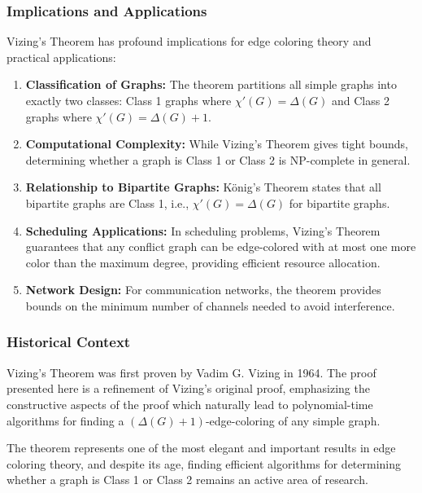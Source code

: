 \documentclass{article}
\theoremstyle{definition}
\begin{document}
\subsubsection{Implications and Applications}

Vizing's Theorem has profound implications for edge coloring theory and practical applications:

\begin{enumerate}
\item \textbf{Classification of Graphs:} The theorem partitions all simple graphs into exactly two classes: Class 1 graphs where $\chi'(G) = \Delta(G)$ and Class 2 graphs where $\chi'(G) = \Delta(G) + 1$.

\item \textbf{Computational Complexity:} While Vizing's Theorem gives tight bounds, determining whether a graph is Class 1 or Class 2 is NP-complete in general.

\item \textbf{Relationship to Bipartite Graphs:} König's Theorem states that all bipartite graphs are Class 1, i.e., $\chi'(G) = \Delta(G)$ for bipartite graphs.

\item \textbf{Scheduling Applications:} In scheduling problems, Vizing's Theorem guarantees that any conflict graph can be edge-colored with at most one more color than the maximum degree, providing efficient resource allocation.

\item \textbf{Network Design:} For communication networks, the theorem provides bounds on the minimum number of channels needed to avoid interference.
\end{enumerate}

\subsubsection{Historical Context}

Vizing's Theorem was first proven by Vadim G. Vizing in 1964. The proof presented here is a refinement of Vizing's original proof, emphasizing the constructive aspects of the proof which naturally lead to polynomial-time algorithms for finding a $(\Delta(G) + 1)$-edge-coloring of any simple graph.

The theorem represents one of the most elegant and important results in edge coloring theory, and despite its age, finding efficient algorithms for determining whether a graph is Class 1 or Class 2 remains an active area of research.
\end{document}
